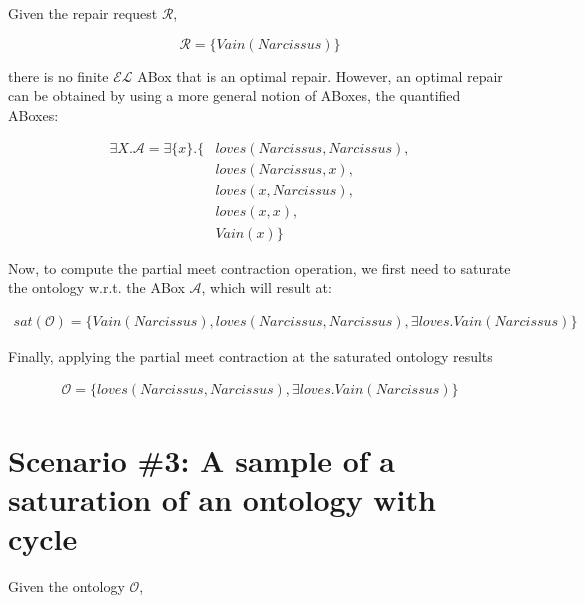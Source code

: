 Given the repair request $\mathcal{R}$,

$$\mathcal{R} = \{ Vain(Narcissus) \}$$

there is no finite $\mathcal{EL}$ ABox that is an optimal repair. However, an optimal repair can be obtained by using a more general notion of ABoxes, the quantified ABoxes:

\begin{equation*}
    \begin{aligned}
        \exists X.\mathcal{A} = \exists \{ x \}.\{ & loves(Narcissus, Narcissus),  \\
                                                   & loves(Narcissus, x),          \\
                                                   & loves(x, Narcissus),          \\
                                                   & loves(x, x),                  \\ 
                                                   & Vain(x) \}
    \end{aligned}
\end{equation*}

Now, to compute the partial meet contraction operation, we first need to saturate the ontology w.r.t. the ABox $\mathcal{A}$, which will result at:

\begin{equation*}
    \begin{aligned}
        sat(\mathcal{O}) = \{ Vain(Narcissus), loves(Narcissus, Narcissus), \exists loves.Vain(Narcissus) \}
    \end{aligned}
\end{equation*}

Finally, applying the partial meet contraction at the saturated ontology results

\begin{equation*}
    \begin{aligned}
        \mathcal{O} = \{ loves(Narcissus, Narcissus), \exists loves.Vain(Narcissus) \}
    \end{aligned}
\end{equation*}

\section{Scenario \#3: A sample of a saturation of an ontology with cycle}
\label{sec:scenario-3}

Given the ontology $\mathcal{O}$,

